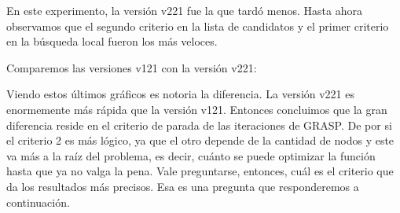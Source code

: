En este experimento, la versión v221 fue la que tardó menos.
Hasta ahora observamos que el segundo criterio en la lista de candidatos y el primer criterio en la búsqueda local fueron los más veloces.

\medskip

Comparemos las versiones v121 con la versión v221:

\begin{center}



\end{center}

Viendo estos últimos gráficos es notoria la diferencia. La versión v221 es enormemente más rápida que la versión v121.
Entonces concluimos que la gran diferencia reside en el criterio de parada de las iteraciones de GRASP.
De por si el criterio 2 es más lógico, ya que el otro depende de la cantidad de nodos y este va más a la raíz del problema, es decir, cuánto se puede optimizar la función hasta que ya no valga la pena.
Vale preguntarse, entonces, cuál es el criterio que da los resultados más precisos.
Esa es una pregunta que responderemos a continuación.

